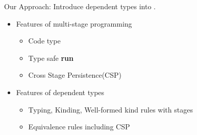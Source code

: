 \documentclass[dvipdfmx,aspectratio=169, 20pt]{beamer}
\begin{document}

\begin{frame}[fragile]{Our Approach: \LMD}
    Introduce dependent types into .
    \begin{itemize}
        \item Features of multi-stage programming
            \begin{itemize}
                \item Code type
                \item Type safe {\bf{run}}
                \item Cross Stage Persistence(CSP)
            \end{itemize}
        \item Features of dependent types
            \begin{itemize}
                \item Typing, Kinding, Well-formed kind rules with stages
                \item Equivalence rules including CSP
            \end{itemize}
    \end{itemize}
\end{frame}
\end{document}
